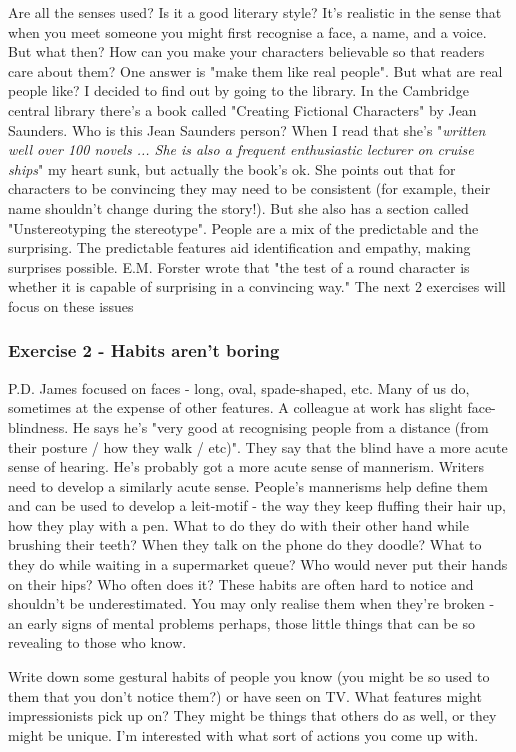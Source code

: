 \documentclass[11pt]{article}
\newenvironment{narrow}[2]{%
 \begin{list}{}{%
  \setlength{\topsep}{0pt}%
  \setlength{\leftmargin}{#1}%
  \setlength{\rightmargin}{#2}%
  \setlength{\listparindent}{\parindent}%
  \setlength{\itemindent}{\parindent}%
  \setlength{\parsep}{\parskip}%
 }%
\item[]}{\end{list}}
\begin{document}
 Are all the senses used? Is it a good literary style? It's realistic in the sense that when you meet someone you might first recognise a face, a name, and a voice. But what then?
How can you make your characters believable so that readers care about them?
One answer is "make them like real people". But what are real people like? I 
decided to find out by going to the library.
In the Cambridge central library there's a book called "Creating Fictional
  Characters" by Jean Saunders. Who is this Jean Saunders person? When I read
  that she's "\textit{written well over 100 novels ... She is also a frequent
    enthusiastic lecturer on cruise ships}" my heart sunk, but actually the
  book's ok. She points  out that for characters to be convincing they may need
  to be consistent (for example, their name shouldn't change during the story!). But she also has a section called "Unstereotyping the stereotype". People are a mix of the predictable and the surprising. The predictable features aid identification and empathy, making surprises possible. E.M. Forster wrote that "the test of a round character is whether it is capable of surprising in a convincing way."
The next 2 exercises will focus on these issues




\subsubsection*{Exercise 2 - Habits aren't boring}
P.D. James focused on faces - long, oval, spade-shaped, etc. Many of us do,
sometimes at the expense of other features. A colleague at work has slight
face-blindness. He says he's "very good at recognising people from a distance
(from their posture / how they walk / etc)". They say that the blind have a
more acute sense of hearing. He's probably got a more acute sense of
mannerism. Writers need to develop a similarly acute sense. People's mannerisms
help define them and can be used to develop a leit-motif - the way they keep
fluffing their hair up, how they play with a pen. What to do they do with their
other hand while brushing their teeth? When they talk on the phone do they
doodle? What to they do while waiting in a supermarket queue? Who would never
put their hands on their hips? Who often does it?  These habits are often hard
to notice and shouldn't be underestimated. You may only realise them when
they're broken - an early signs of mental problems perhaps, those little things
that can be so revealing to those who know.

\begin{narrow}{1.0cm}{1.0cm} 
Write down some gestural habits of people you know (you might be so used to 
them that you don't notice them?) or have seen on TV. What features might 
impressionists pick up on? They might be things that others do as well, or 
they might be unique. I'm interested with what sort of actions you come up with.
\end{narrow}
\end{document}

